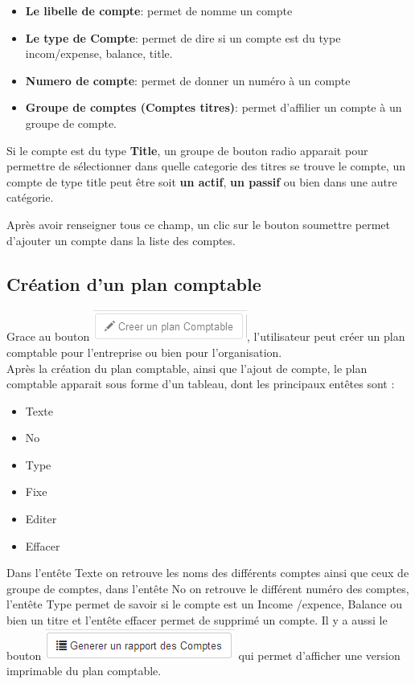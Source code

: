 \documentclass[12pt,a4paper]{report}
\begin{document}
\begin{itemize}
\item \textbf{Le libelle de compte}: permet de nomme un compte \\
\item \textbf{Le type de Compte}: permet de dire si un compte est du type incom/expense, balance, title.\\
\item \textbf{Numero de compte}: permet de donner un numéro à un compte \\
\item \textbf{Groupe de comptes (Comptes titres)}: permet d'affilier un compte à un groupe de compte.\\
\end{itemize}

Si le compte est du type \textbf{Title}, un groupe de bouton radio apparait pour permettre de sélectionner dans quelle categorie des titres se trouve le compte, un compte de type title peut être soit \textbf{un actif}, \textbf{un passif} ou bien dans une autre catégorie.

Après avoir renseigner tous ce champ, un clic sur le bouton soumettre permet d'ajouter un compte dans la liste des comptes.
 
\subsection{Création d'un plan comptable}
Grace au bouton \includegraphics[scale=0.7]{pic/CreePlanCompt.png}, l'utilisateur peut créer un plan comptable pour l'entreprise ou bien pour l'organisation. \\

Après la création du plan comptable, ainsi que l'ajout de compte, le plan comptable apparait sous forme d'un tableau, dont les principaux entêtes sont :
\begin{itemize}
\item Texte
\item No
\item Type
\item Fixe
\item Editer
\item Effacer
\end{itemize}

Dans l'entête Texte on retrouve les noms des différents comptes ainsi que ceux de groupe de comptes, dans l'entête No on retrouve le différent numéro des comptes, l'entête Type permet de savoir si le compte est un Income /expence, Balance ou bien un titre et l'entête effacer permet de supprimé un compte.  Il y a aussi le bouton \includegraphics[scale=0.7]{pic/GenereRapportCompt.png} qui permet d'afficher une version imprimable du plan comptable.
\end{document}
